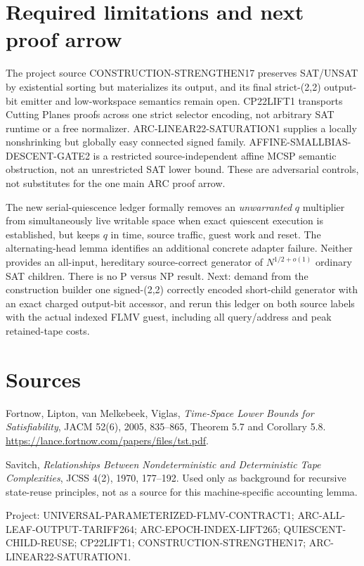 \documentclass[11pt]{article}
\begin{document}
\section{Required limitations and next proof arrow}
The project source CONSTRUCTION-STRENGTHEN17 preserves SAT/UNSAT by existential sorting but materializes its output, and its final strict-(2,2) output-bit emitter and low-workspace semantics remain open. CP22LIFT1 transports Cutting Planes proofs across one strict selector encoding, not arbitrary SAT runtime or a free normalizer. ARC-LINEAR22-SATURATION1 supplies a locally nonshrinking but globally easy connected signed family. AFFINE-SMALLBIAS-DESCENT-GATE2 is a restricted source-independent affine MCSP semantic obstruction, not an unrestricted SAT lower bound. These are adversarial controls, not substitutes for the one main ARC proof arrow.

The new serial-quiescence ledger formally removes an \emph{unwarranted} $q$ multiplier from simultaneously live writable space when exact quiescent execution is established, but keeps $q$ in time, source traffic, guest work and reset. The alternating-head lemma identifies an additional concrete adapter failure. Neither provides an all-input, hereditary source-correct generator of $N^{1/2+o(1)}$ ordinary SAT children. There is no P versus NP result. Next: demand from the construction builder one signed-(2,2) correctly encoded short-child generator with an exact charged output-bit accessor, and rerun this ledger on both source labels with the actual indexed FLMV guest, including all query/address and peak retained-tape costs.

\section*{Sources}
\noindent [1] Fortnow, Lipton, van Melkebeek, Viglas, \emph{Time-Space Lower Bounds for Satisfiability}, JACM 52(6), 2005, 835--865, Theorem 5.7 and Corollary 5.8. \url{https://lance.fortnow.com/papers/files/tst.pdf}.

\noindent [2] Savitch, \emph{Relationships Between Nondeterministic and Deterministic Tape Complexities}, JCSS 4(2), 1970, 177--192. Used only as background for recursive state-reuse principles, not as a source for this machine-specific accounting lemma.

\noindent [3] Project: UNIVERSAL-PARAMETERIZED-FLMV-CONTRACT1; ARC-ALL-LEAF-OUTPUT-TARIFF264; ARC-EPOCH-INDEX-LIFT265; QUIESCENT-CHILD-REUSE; CP22LIFT1; CONSTRUCTION-STRENGTHEN17; ARC-LINEAR22-SATURATION1.
\end{document}
